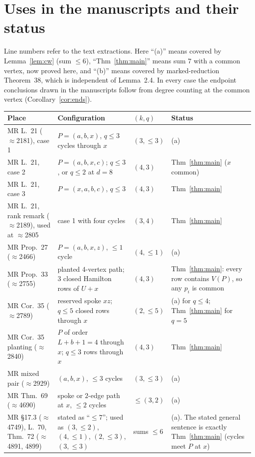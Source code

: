 \documentclass[11pt]{amsart}
\theoremstyle{definition}
\theoremstyle{remark}
\begin{document}
\section{Uses in the manuscripts and their status}\label{sec:uses}

Line numbers refer to the text extractions. Here ``(a)'' means covered by Lemma~\ref{lem:cw}
(sum $\le 6$), ``Thm~\ref{thm:main}'' means sum $7$ with a common vertex, now proved here, and
``(b)'' means covered by marked-reduction Theorem~38, which is independent of Lemma~2.4. In every
case the endpoint conclusions drawn in the manuscripts follow from degree counting at the common
vertex (Corollary~\ref{cor:ends}).

\begin{longtable}{L{3.4cm}L{5.0cm}L{1.4cm}L{4.4cm}}
\toprule
Place & Configuration & $(k,q)$ & Status\\
\midrule
\endhead
MR L.~21 ($\approx$2181), case 1 & $P=(a,b,x)$, $q\le 3$ cycles through $x$ & $(3,\le3)$ & (a)\\
MR L.~21, case 2 & $P=(a,b,x,c)$; $q\le 3$, or $q\le 2$ at $d=8$ & $(4,3)$ & Thm~\ref{thm:main} ($x$ common)\\
MR L.~21, case 3 & $P=(x,a,b,c)$, $q\le 3$ & $(4,3)$ & Thm~\ref{thm:main}\\
MR L.~21, rank remark ($\approx$2189), used at $\approx$2805 & case 1 with four cycles & $(3,4)$ & Thm~\ref{thm:main}\\
MR Prop.~27 ($\approx$2466) & $P=(a,b,x,z)$, $\le1$ cycle & $(4,\le1)$ & (a)\\
MR Prop.~33 ($\approx$2755) & planted 4-vertex path; 3 closed Hamilton rows of $U+x$ & $(4,3)$ & Thm~\ref{thm:main}: every row contains $V(P)$, so any $p_i$ is common\\
MR Cor.~35 ($\approx$2789) & reserved spoke $xz$; $q\le5$ closed rows through $x$ & $(2,\le5)$ & (a) for $q\le4$; Thm~\ref{thm:main} for $q=5$\\
MR Cor.~35 planting ($\approx$2840) & $P$ of order $L+b+1=4$ through $x$; $q\le 3$ rows through $x$ & $(4,3)$ & Thm~\ref{thm:main}\\
MR mixed pair ($\approx$2929) & $(a,b,x)$, $\le3$ cycles & $(3,\le3)$ & (a)\\
MR Thm.~69 ($\approx$4690) & spoke or $2$-edge path at $x$, $\le2$ cycles & $\le(3,2)$ & (a)\\
MR \S17.3 ($\approx$4749), L.~70, Thm.~72 ($\approx$4891, 4899) & stated as ``$\le7$''; used as $(3,\le2)$, $(4,\le1)$, $(2,\le3)$, $(3,\le3)$ & sums $\le6$ & (a). The stated general sentence is exactly Thm~\ref{thm:main} (cycles meet $P$ at $x$)\\

\end{longtable}
\end{document}

